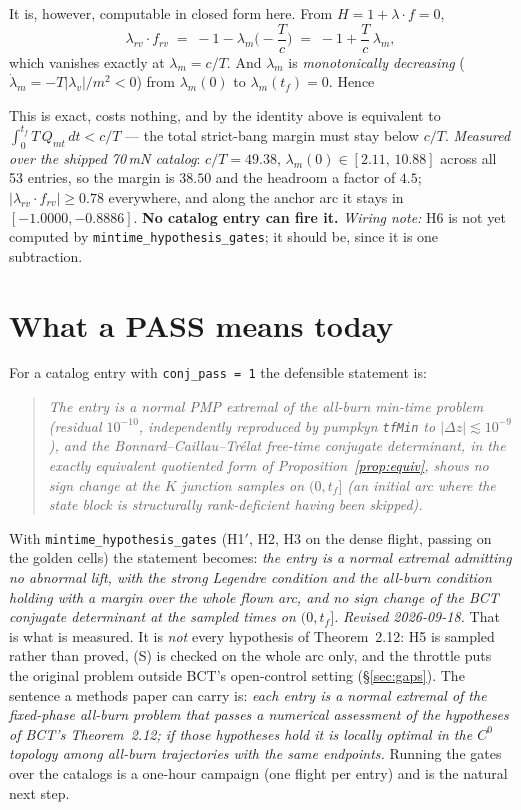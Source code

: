 \documentclass[11pt]{article}
\theoremstyle{definition}
\newcommand{\lv}{\lambda_v}
\newcommand{\lm}{\lambda_m}
\newcommand{\tf}{t_f}
\begin{document}
It is, however, computable in closed form here. From $H=1+\lambda\!\cdot\!f=0$,
\[
  \lambda_{rv}\!\cdot\!f_{rv}
  \;=\;-1-\lm\Big(-\frac{T}{c}\Big)\;=\;-1+\frac{T}{c}\,\lm ,
\]
which vanishes exactly at $\lm=c/T$. And $\lm$ is \emph{monotonically
decreasing} ($\dot\lm=-T|\lv|/m^{2}<0$) from $\lm(0)$ to $\lm(\tf)=0$. Hence

\begin{center}\fbox{\textbf{H6:} the spurious mechanism cannot fire iff
$\lm(0)<c/T$.}\end{center}

\noindent This is exact, costs nothing, and by the identity above is equivalent
to $\int_0^{\tf}T\,Q_{mt}\,dt<c/T$ --- the total strict-bang margin must stay
below $c/T$. \emph{Measured over the shipped 70\,mN catalog}: $c/T=49.38$,
$\lm(0)\in[2.11,\,10.88]$ across all 53 entries, so the margin is $38.50$ and
the headroom a factor of $4.5$; $|\lambda_{rv}\!\cdot\!f_{rv}|\ge0.78$
everywhere, and along the anchor arc it stays in $[-1.0000,-0.8886]$. \textbf{No
catalog entry can fire it.} \emph{Wiring note:} H6 is not yet computed by
\texttt{mintime\_hypothesis\_gates}; it should be, since it is one subtraction.

\section{What a PASS means today}\label{sec:meaning}
For a catalog entry with \texttt{conj\_pass = 1} the defensible statement is:
\begin{quote}
\emph{The entry is a normal PMP extremal of the all-burn min-time problem
(residual $10^{-10}$, independently reproduced by pumpkyn \texttt{tfMin}
to $|\Delta z|\lesssim10^{-9}$), and the Bonnard--Caillau--Tr\'elat free-time
conjugate determinant, in the exactly equivalent quotiented form of
Proposition~\ref{prop:equiv}, shows no sign change at the $K$ junction samples
on $(0,\tf]$ (an initial arc where the state block is structurally rank-deficient
having been skipped).}
\end{quote}
With \texttt{mintime\_hypothesis\_gates} (H1$'$, H2, H3 on the dense flight,
passing on the golden cells) the statement becomes: \emph{the entry is a
normal extremal admitting no abnormal lift, with the strong Legendre condition
and the all-burn condition holding with a margin over the whole flown arc, and
no sign change of the BCT conjugate determinant at the sampled times on
$(0,\tf]$.}
\emph{Revised 2026-09-18.} That is what is measured. It is \emph{not} every
hypothesis of Theorem~2.12: H5 is sampled rather than proved, (S) is checked on
the whole arc only, and the throttle puts the original problem outside BCT's
open-control setting (\S\ref{sec:gaps}). The sentence a methods paper can carry
is: \emph{each entry is a normal extremal of the fixed-phase all-burn problem
that passes a numerical assessment of the hypotheses of BCT's Theorem~2.12; if
those hypotheses hold it is locally optimal in the $C^0$ topology among
all-burn trajectories with the same endpoints.} Running the gates over the catalogs is a
one-hour campaign (one flight per entry) and is the natural next step.
\end{document}
